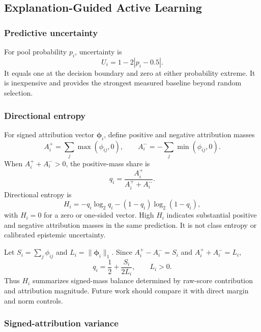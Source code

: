 \subsection{Explanation-Guided Active Learning}

\subsubsection{Predictive uncertainty}

For pool probability $p_i$, uncertainty is
\begin{equation}
U_i=1-2|p_i-0.5|.
\label{eq:uncertainty}
\end{equation}
It equals one at the decision boundary and zero at either probability extreme.
It is inexpensive and provides the strongest measured baseline beyond random
selection.

\subsubsection{Directional entropy}

For signed attribution vector $\boldsymbol{\phi}_i$, define positive and negative
attribution masses
\begin{equation}
A_i^+=\sum_j\max(\phi_{ij},0),\qquad
A_i^-=-\sum_j\min(\phi_{ij},0).
\end{equation}
When $A_i^++A_i^->0$, the positive-mass share is
\begin{equation}
q_i=\frac{A_i^+}{A_i^++A_i^-}.
\end{equation}
Directional entropy is
\begin{equation}
H_i=-q_i\log_2 q_i-(1-q_i)\log_2(1-q_i),
\label{eq:entropy}
\end{equation}
with $H_i=0$ for a zero or one-sided vector. High $H_i$ indicates substantial
positive and negative attribution masses in the same prediction. It is not
class entropy or calibrated epistemic uncertainty.

Let $S_i=\sum_j\phi_{ij}$ and $L_i=\|\boldsymbol{\phi}_i\|_1$. Since
$A_i^+-A_i^-=S_i$ and $A_i^++A_i^-=L_i$,
\begin{equation}
q_i=\frac{1}{2}+\frac{S_i}{2L_i},\qquad L_i>0.
\label{eq:h-identity}
\end{equation}
Thus $H_i$ summarizes signed-mass balance determined by raw-score contribution
and attribution magnitude. Future work should compare it with direct margin and
norm controls.

\subsubsection{Signed-attribution variance}

